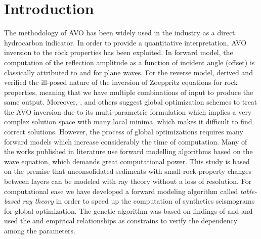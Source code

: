 \documentclass{vie16}
\begin{document}
\section{Introduction}
The methodology of AVO has been widely used in the industry as a
direct hydrocarbon indicator. In order to provide a quantitative
interpretation, AVO inversion to the rock properties has been
exploited. In forward model, the computation of the reflection
amplitude as a function of incident angle (offset) is
classically attributed to \cite{Zoeppritz1919} and
\cite{Knott1899} for plane waves. For the reverse model,
\cite{Rosa1976} derived and verified the ill-posed nature of the
inversion of Zoeppritz equations for rock properties, meaning
that we have multiple combinations of input to produce the same
output.  Moreover, \cite{Stoffa1991}, \cite{Mallick1995} and
others suggest global optimization schemes to treat the AVO
inversion due to its multi-parametric formulation which implies
a very complex solution space with many local minima, which
makes it difficult to find correct solutions. However, the
process of global optimizations requires many forward models
which increase considerably the time of computation. Many of the
works published in literature use forward modelling algorithms
based on the wave equation, which demands great computational
power. This study is based on the premise that unconsolidated
sediments with small rock-property changes between layers can be
modeled with ray theory without a loss of resolution. For
computational ease we have developed a forward modeling
algorithm called \textit{table-based ray theory} in order to
speed up the computation of synthetics seismograms for global
optimization.  The genetic algorithm was based on findings of
\cite{Stoffa1991} and \cite{Sen1992} and used the
\cite{Gardner1974} and \cite{Castagna1985} empirical
relationships as constrains to verify the dependency among the
parameters.
\end{document}
